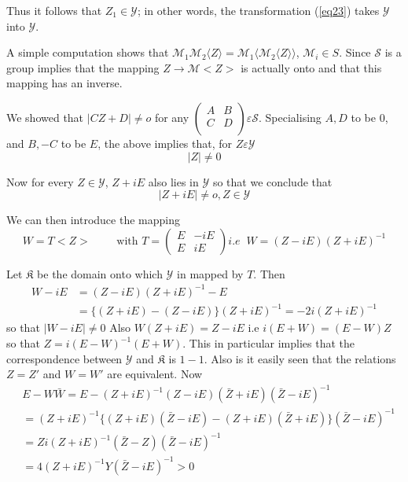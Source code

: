Thus it follows that $Z_1 \in \mathscr{Y}$; in other words, the
transformation (\ref{eq23}) takes $\mathscr{Y}$ into $\mathscr{Y}$. 

A simple computation shows that $\mathcal{M}_1\mathcal{M}_2 \langle Z
\rangle = \mathcal{M}_1 
\langle \mathcal{M}_2 \langle Z \rangle \rangle$, $\mathcal{M}_i \in
S$. Since\pageoriginale 
$\mathcal{S}$ is a group implies that the mapping $ Z \to \mathcal{M}
< Z>$ is 
actually onto and that this mapping has an inverse.   

We showed that $| C Z + D| \neq o$ for any $\begin{pmatrix} A & B \\ C
  & D \\ \end{pmatrix} \varepsilon \mathcal{S}$. Specialising $A,D$ to
be 0, and $B, -C$ to be $E$, the above implies that, for $ Z
\varepsilon \mathscr{Y}$ 
\begin{equation*}
|Z| \neq 0 \tag{25}\label{eq25} 
\end{equation*}

Now for every $ Z \in \mathscr{Y}$, $Z + iE$ also lies in
$\mathscr{Y}$ so that we conclude that 
\begin{equation*}
|Z + i E| \neq o, Z \in \mathscr{Y} \tag*{$(25)'$}\label{eq25'}  
\end{equation*}

We can then introduce the mapping 
$$
W = T < Z > \qquad \text{ with } T = \begin{pmatrix} E & -iE\\ E &
  iE \end{pmatrix} i.e \;\; W = (Z - iE) (Z + iE)^{-1} 
$$

Let $\mathfrak{K}$ be the domain onto which $\mathscr{Y}$ in mapped by
$T$. Then 
\begin{align*}
W-iE & = (Z -iE) (Z + iE)^{-1} -E\\
& = \{ (Z+iE) - (Z-iE)\} (Z+iE)^{-1} = -2i (Z+iE)^{-1}
\end{align*}
so that $|W-iE| \neq 0$  Also $W(Z+iE) = Z-iE $ i.e $i(E+W) = (E-W)Z$
so that $Z = i(E-W)^{-1} (E+W)$. This in particular implies that the
correspondence between $\mathscr{Y}$ and $\mathfrak{K}$ is $1-1$. Also
is it easily seen that the relations $Z = Z'$ and $ W = W'$ are
equivalent. Now 
\begin{align*}
& E - W \bar{W} = E-(Z+iE)^{-1} (Z-iE) (\bar{Z}+iE) (\bar{Z}-iE)^{-1}\\
& = (Z+iE)^{-1} \{ (Z+iE) (\bar{Z}-iE) - (Z+iE) (\bar{Z}+iE)\}
  (\bar{Z}-iE)^{-1}\\ 
& = Zi(Z+iE)^{-1} (\bar{Z}-Z) (\bar{Z}-iE)^{-1}\\
& = 4 (Z+iE)^{-1} Y (\bar{Z}-iE)^{-1} > 0
\end{align*}

